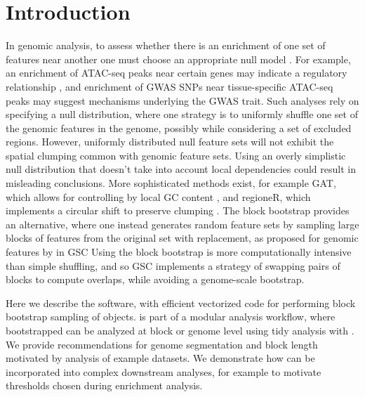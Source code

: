 \section{Introduction}

In genomic analysis, to assess whether
there is an enrichment of one set of features near another 
one must choose an appropriate null model \citep{reviewdilemma2014}.
For example, an enrichment of ATAC-seq peaks near certain genes
may indicate a regulatory relationship \citep{lee2020fluent},
and enrichment of GWAS SNPs near tissue-specific ATAC-seq peaks may
suggest mechanisms underlying the GWAS trait.
Such analyses rely on specifying a null distribution, where one
strategy is to uniformly shuffle one set of the
genomic features in the genome, possibly while considering a set of
excluded regions.
However, uniformly distributed null feature sets will not exhibit the
spatial clumping common with genomic feature sets.
Using an overly simplistic null distribution that doesn't take into
account local dependencies could result in misleading conclusions.
More sophisticated methods exist, for example
GAT, which allows for controlling by local GC content
\citep{GAT_2013}, and regioneR, which implements a circular shift to
preserve clumping \citep{gel2016regioner}.
The block bootstrap \citep{politis1999subsampling}
provides an alternative, where one instead generates
random feature sets by sampling large blocks of features from the
original set with replacement, as proposed for 
genomic features by \citet{bickel2010subsampling} in GSC
Using the block bootstrap is more
computationally intensive than simple shuffling, and so GSC implements
a strategy of swapping pairs of blocks to compute overlaps, while
avoiding a genome-scale bootstrap.

Here we describe the \bootranges software, with efficient
vectorized code for performing block bootstrap sampling of
\granges \citep{lawrence2013software} objects.
\bootranges is part of a modular analysis workflow, where bootstrapped
\granges can be analyzed at block or genome level using tidy
analysis with \plyranges \citep{lee2019plyranges}.
We provide recommendations for genome segmentation and block length
motivated by analysis of example datasets.
We demonstrate how \bootranges can be incorporated into complex
downstream analyses, for example to motivate thresholds chosen during
enrichment analysis.

